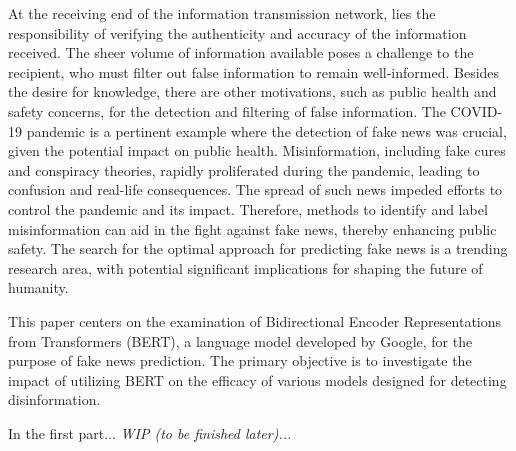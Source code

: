 At the receiving end of the information transmission network, lies the responsibility of verifying the authenticity and accuracy of the information received. The sheer volume of information available poses a challenge to the recipient, who must filter out false information to remain well-informed. Besides the desire for knowledge, there are other motivations, such as public health and safety concerns, for the detection and filtering of false information. The COVID-19 pandemic is a pertinent example where the detection of fake news was crucial, given the potential impact on public health. Misinformation, including fake cures and conspiracy theories, rapidly proliferated during the pandemic, leading to confusion and real-life consequences. The spread of such news impeded efforts to control the pandemic and its impact. Therefore, methods to identify and label misinformation can aid in the fight against fake news, thereby enhancing public safety. The search for the optimal approach for predicting fake news is a trending research area, with potential significant implications for shaping the future of humanity.

This paper centers on the examination of Bidirectional Encoder Representations from Transformers (BERT), a language model developed by Google, for the purpose of fake news prediction. The primary objective is to investigate the impact of utilizing BERT on the efficacy of various models designed for detecting disinformation.


In the first part... \textit{WIP (to be finished later)...}